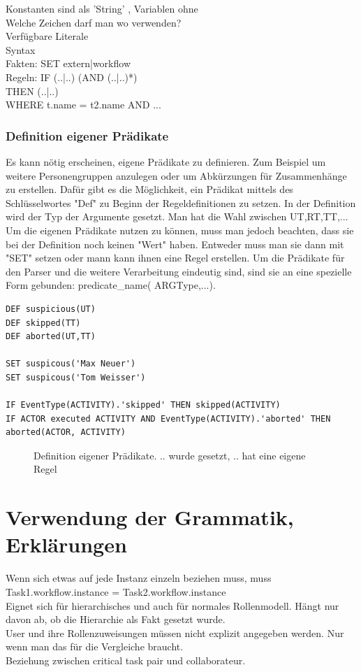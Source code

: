 Konstanten sind als 'String' , Variablen ohne \\
Welche Zeichen darf man wo verwenden?\\
Verfügbare Literale\\
Syntax\\
Fakten: SET extern|workflow \\
Regeln: 	IF (..|..) (AND (..|..)*) \\
THEN (..|..) \\
WHERE t.name = t2.name AND  ...\\

\subsubsection{Definition eigener Prädikate}
Es kann nötig erscheinen, eigene Prädikate zu definieren. Zum Beispiel um weitere Personengruppen anzulegen oder um Abkürzungen für Zusammenhänge zu erstellen. Dafür gibt es die Möglichkeit, ein Prädikat mittels des Schlüsselwortes "Def" zu Beginn der Regeldefinitionen zu setzen. In der Definition wird der Typ der Argumente gesetzt. Man hat die Wahl zwischen UT,RT,TT,...
Um die eigenen Prädikate nutzen zu können, muss man jedoch beachten, dass sie bei der Definition noch keinen "Wert" haben. Entweder muss man sie dann mit "SET" setzen oder mann kann ihnen eine Regel erstellen. Um die Prädikate für den Parser und die weitere Verarbeitung eindeutig sind, sind sie an eine spezielle Form gebunden: predicate{\_}name( ARGType,...).

\begin{verbatim}
DEF suspicious(UT)
DEF skipped(TT)
DEF aborted(UT,TT)

SET suspicous('Max Neuer')
SET suspicous('Tom Weisser')

IF EventType(ACTIVITY).'skipped' THEN skipped(ACTIVITY)
IF ACTOR executed ACTIVITY AND EventType(ACTIVITY).'aborted' THEN aborted(ACTOR, ACTIVITY)
\end{verbatim}
\begin{figure}[!h]
\caption{Definition eigener Prädikate. .. wurde gesetzt, .. hat eine eigene Regel}
\label{fig:define}
\end{figure}

%
%
\section{Verwendung der Grammatik, Erklärungen}
Wenn sich etwas auf jede Instanz einzeln beziehen muss, muss Task1.workflow.instance = Task2.workflow.instance\\
Eignet sich für hierarchisches und auch für normales Rollenmodell. Hängt nur davon ab, ob die Hierarchie als Fakt gesetzt wurde.\\
User und ihre Rollenzuweisungen müssen nicht explizit angegeben werden. Nur wenn man das für die Vergleiche braucht.\\
Beziehung zwischen critical task pair und collaborateur.
